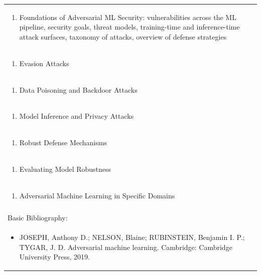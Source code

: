 \documentclass[11pt]{article}
\begin{document}
\begin{center}
\begin{longtable}{|p{4cm}|p{4cm}|p{4cm}|p{4cm}|}
\multicolumn{4}{|p{\dimexpr 16cm + 6\tabcolsep\relax}|}{\begin{enumerate}[start=1]\item Foundations of Adversarial ML Security: vulnerabilities across the ML pipeline, security goals, threat models, training-time and inference-time attack surfaces, taxonomy of attacks, overview of defense strategies\end{enumerate}}\\
\multicolumn{4}{|p{\dimexpr 16cm + 6\tabcolsep\relax}|}{\begin{enumerate}[start=2]\item Evasion Attacks\end{enumerate}}\\
\multicolumn{4}{|p{\dimexpr 16cm + 6\tabcolsep\relax}|}{\begin{enumerate}[start=3]\item Data Poisoning and Backdoor Attacks\end{enumerate}}\\
\multicolumn{4}{|p{\dimexpr 16cm + 6\tabcolsep\relax}|}{\begin{enumerate}[start=4]\item Model Inference and Privacy Attacks\end{enumerate}}\\
\multicolumn{4}{|p{\dimexpr 16cm + 6\tabcolsep\relax}|}{\begin{enumerate}[start=5]\item Robust Defense Mechanisms\end{enumerate}}\\
\multicolumn{4}{|p{\dimexpr 16cm + 6\tabcolsep\relax}|}{\begin{enumerate}[start=6]\item Evaluating Model Robustness\end{enumerate}}\\
\multicolumn{4}{|p{\dimexpr 16cm + 6\tabcolsep\relax}|}{\begin{enumerate}[start=7]\item Adversarial Machine Learning in Specific Domains\end{enumerate}}\\
\multicolumn{4}{|p{\dimexpr 16cm + 6\tabcolsep\relax}|}{}\\
\hline
\multicolumn{4}{|p{16cm}|}{Basic Bibliography:}\\*
\multicolumn{4}{|p{\dimexpr 16cm + 6\tabcolsep\relax}|}{\begin{itemize}\item JOSEPH, Anthony D.; NELSON, Blaine; RUBINSTEIN, Benjamin I. P.; TYGAR, J. D. Adversarial machine learning. Cambridge: Cambridge University Press, 2019.\end{itemize}}\\

\end{longtable}
\end{center}
\end{document}

